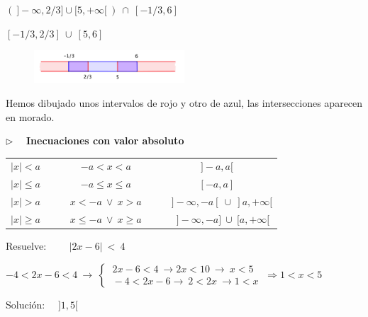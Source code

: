 \begin{miejercicio}
\begin{multicols}{2}
$ \left( \ ]-\infty, 2/3]\cup[5,+\infty[ \ \right) \ \cap \  [-1/3,6] $

\begin{center}$[-1/3,2/3] \ \cup \ [5,6]$\end{center}
	\begin{figure}[H]
		\centering
		\includegraphics[width=0.5\textwidth]{img-ecc/ecc13.png}
	\end{figure}
\end{multicols}
\begin{small} \textcolor{gris}{Hemos dibujado unos intervalos de rojo y otro de azul, las intersecciones aparecen en morado.}	 \end{small}
\end{miejercicio}


\vspace{3mm}
\begin{large}
$\triangleright \quad $ \textbf{Inecuaciones con valor absoluto}	
\end{large}
\vspace{2mm}

\begin{adjustwidth}{50pt}{50pt}
\begin{destacado}
\begin{table}[H]
\centering
\begin{tabular}{lcc}
$|x|<a$ & $-a<x<a$ & $]-a,a[$ \\
$|x|\leqslant a$ & $-a\leqslant x \leqslant a$ & $[-a,a]$ \\
$|x|>a \quad $ & $\quad  x<-a \ \vee \ x>a \quad $ & $\quad ]-\infty,-a[ \ \cup \ ]a,+\infty[$ \\
$|x|\geqslant a \quad $ & $ \quad x \leqslant -a \ \vee \ x \geqslant a \quad $ & $\ \quad ]-\infty,-a] \ \cup \ [a,+\infty[$
\end{tabular}
\end{table}
\vspace{-10mm}
\end{destacado}
\end{adjustwidth}

\begin{miejemplo}
	
	Resuelve: $\qquad |2x-6| \ < \ 4$

\vspace{4mm} $-4<2x-6<4 \ \to \ \begin{cases}
 \ 2x-6<4 \ \to 2x<10 \ \to \ x<5 \\ \ -4<2x-6 \to \ 2<2x \ \to 1<x	
 \end{cases} \ \Rightarrow 1<x<5$
 
 \vspace{2mm} Solución: $\quad ]1,5[$



\end{miejemplo}

